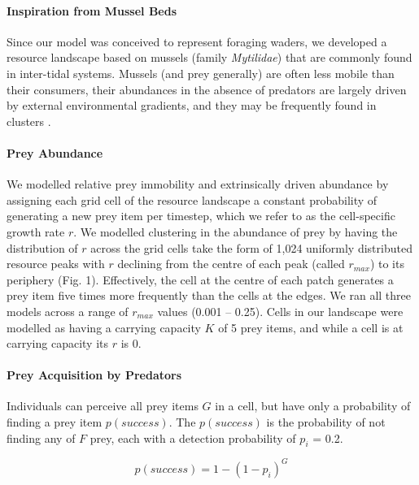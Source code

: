 \documentclass[11pt]{article}
\begin{document}
\paragraph{Inspiration from Mussel Beds}

Since our model was conceived to represent foraging waders, we developed a resource landscape based on mussels (family \textit{Mytilidae}) that are commonly found in inter-tidal systems.
Mussels (and prey generally) are often less mobile than their consumers, their abundances in the absence of predators are largely driven by external environmental gradients, and they may be frequently found in clusters \citep{dejager2011, dejager2020}.

\paragraph{Prey Abundance}

We modelled relative prey immobility and extrinsically driven abundance by assigning each grid cell of the resource landscape a constant probability of generating a new prey item per timestep, which we refer to as the cell-specific growth rate $r$.
We modelled clustering in the abundance of prey by having the distribution of $r$ across the grid cells take the form of 1,024 uniformly distributed resource peaks with $r$ declining from the centre of each peak (called $r_{max}$) to its periphery (Fig. 1).
Effectively, the cell at the centre of each patch generates a prey item five times more frequently than the cells at the edges.
We ran all three models across a range of $r_{max}$ values (0.001 -- 0.25).
Cells in our landscape were modelled as having a carrying capacity $K$ of 5 prey items, and while a cell is at carrying capacity its $r$ is 0.

\paragraph{Prey Acquisition by Predators}

Individuals can perceive all prey items $G$ in a cell, but have only a probability of finding a prey item $p(success)$.
The $p(success)$ is the probability of not finding any of $F$ prey, each with a detection probability of $p_i$ = 0.2.
\begin{linenomath*}
    \begin{equation}
        p({success}) = 1 - \left(1 - p_i\right) ^ G
    \end{equation}
\end{linenomath*}
\end{document}
